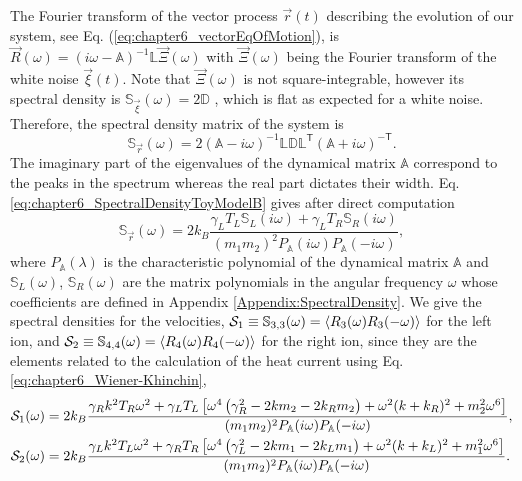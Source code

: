 The Fourier transform of the vector process $\overrightarrow{r}(t)$ describing the evolution of our system, see Eq. (\ref{eq:chapter6_vectorEqOfMotion}),
is $\overrightarrow{R}(\omega) = \left( i \omega - \mathbb{A} \right)^{-1}\mathbb{L}\overrightarrow{\Xi}(\omega)$ with $\overrightarrow{\Xi}(\omega)$ being the Fourier transform of the white noise $\overrightarrow{\xi}(t)$. Note that $\overrightarrow{\Xi}(\omega)$ is not square-integrable, however its spectral density is $\mathbb{S}_{\overrightarrow{\xi}}(\omega) = 2 \mathbb{D}$ \cite{Sarkka2019}, which is flat as expected for a white noise. Therefore, the spectral density matrix of the system is
%
\begin{equation}
  \mathbb{S}_{\overrightarrow{r}} (\omega)= 2 \left(  \mathbb{A} - i\omega\right)^{-1}\mathbb{L}\mathbb{D}\mathbb{L}^\mathsf{T}\left(  \mathbb{A} + i\omega\right)^{-\mathsf{T}}.
  \label{eq:chapter6_SpectralDensityToyModelB}
\end{equation}
%
The imaginary part of the eigenvalues of the dynamical matrix $\mathbb{A}$ correspond to the peaks in the spectrum whereas the real part dictates their width. Eq. \eqref{eq:chapter6_SpectralDensityToyModelB} gives after direct computation
%
\begin{equation}
  \mathbb{S}_{\overrightarrow{r}}(\omega) = 2 k_B \frac{\gamma_L T_L\mathbb{S}_L(i\omega)+\gamma_L T_R\mathbb{S}_R(i\omega)}{(m_1 m_2)^2 P_\mathbb{A}(i\omega)P_\mathbb{A}(-i\omega)},
\end{equation}
%
where $P_\mathbb{A}(\lambda)$ is the characteristic polynomial of the dynamical matrix $\mathbb{A}$ and $\mathbb{S}_L(\omega)$, $\mathbb{S}_R(\omega)$ are the matrix polynomials in the angular frequency $\omega$ whose coefficients are defined in Appendix \ref{Appendix:SpectralDensity}. We give
the spectral densities for the velocities, ${\cal{S}}_1\equiv\mathbb{S}_{3,3}(\omega) = \expval{R_3(\omega)R_3(-\omega)}$ for the left ion, and ${\cal S}_2\equiv\mathbb{S}_{4,4}(\omega) = \expval{R_4(\omega)R_4(-\omega)}$ for the right ion, since they are the elements related to the calculation of the heat current using Eq. \eqref{eq:chapter6_Wiener-Khinchin},
%
  \begin{align}
    {\cal S}_1(\omega) &= 2 k_B \frac{\gamma_R k^2 T_R \omega ^2+\gamma_L T_L \left[\omega ^4 \left(\gamma_R^2-2 k m_2-2 k_R m_2\right)+\omega ^2 (k+k_R)^2+m_2^2 \omega ^6\right]}{(m_1 m_2)^2 P_\mathbb{A}(i\omega)P_\mathbb{A}(-i\omega)},\nonumber\\
{\cal S}_2(\omega)
&= 2 k_B \frac{\gamma_L k^2 T_L \omega ^2+\gamma_R T_R \left[\omega ^4 \left(\gamma_L^2-2 k m_1-2 k_L m_1\right)+\omega ^2 (k+k_L)^2+m_1^2 \omega ^6\right]}{(m_1 m_2)^2 P_\mathbb{A}(i\omega)P_\mathbb{A}(-i\omega)}.
    \label{eq:chapter6_SpectralDensitiesVelocities}
  \end{align}
